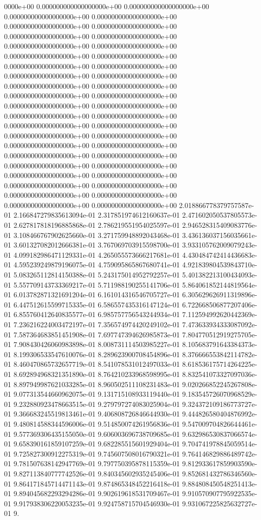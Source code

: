 0000e+00	0.000000000000000000e+00	0.000000000000000000e+00	0.000000000000000000e+00	0.000000000000000000e+00	0.000000000000000000e+00	0.000000000000000000e+00	0.000000000000000000e+00	0.000000000000000000e+00	0.000000000000000000e+00	0.000000000000000000e+00	0.000000000000000000e+00	0.000000000000000000e+00	0.000000000000000000e+00	0.000000000000000000e+00	0.000000000000000000e+00	0.000000000000000000e+00	0.000000000000000000e+00	0.000000000000000000e+00	0.000000000000000000e+00	0.000000000000000000e+00	0.000000000000000000e+00	0.000000000000000000e+00	0.000000000000000000e+00	0.000000000000000000e+00	0.000000000000000000e+00	0.000000000000000000e+00	0.000000000000000000e+00	0.000000000000000000e+00	0.000000000000000000e+00	0.000000000000000000e+00	0.000000000000000000e+00	0.000000000000000000e+00	0.000000000000000000e+00	0.000000000000000000e+00	0.000000000000000000e+00	0.000000000000000000e+00	0.000000000000000000e+00	0.000000000000000000e+00	0.000000000000000000e+00	0.000000000000000000e+00	0.000000000000000000e+00	0.000000000000000000e+00	2.018866778379757587e-01	2.166847279835613094e-01	2.317851974612160637e-01	2.471602050537805573e-01	2.627817818196885868e-01	2.786219551954025597e-01	2.946528315409083776e-01	3.108466767902625660e-01	3.271759948892043468e-01	3.436136037156035661e-01	3.601327082012666381e-01	3.767069703915598700e-01	3.933105762009079243e-01	4.099182986471129331e-01	4.265055573666217681e-01	4.430484742414436683e-01	4.595239249879196075e-01	4.759095865867680741e-01	4.921839804539843710e-01	5.083265112814150388e-01	5.243175014952792257e-01	5.401382213100434093e-01	5.557709143733369217e-01	5.711988190255141706e-01	5.864061852144819564e-01	6.013782871321691204e-01	6.161014316546705727e-01	6.305629626911319896e-01	6.447512615599715335e-01	6.586557435316147124e-01	6.722668506877207406e-01	6.855760412640835577e-01	6.985757756543244934e-01	7.112594992620442369e-01	7.236216224003472197e-01	7.356574974420249102e-01	7.473633934333087092e-01	7.587364683851451908e-01	7.697747394626985873e-01	7.804770512919275705e-01	7.908430426060983898e-01	8.008731114503985227e-01	8.105683791643384373e-01	8.199306533547610076e-01	8.289623900708454896e-01	8.376666553842114782e-01	8.460470865732657719e-01	8.541078531012497033e-01	8.618536175714264225e-01	8.692894968321351890e-01	8.764210233968598995e-01	8.832541073327097036e-01	8.897949987621033285e-01	8.960502511108231483e-01	9.020266852245267808e-01	9.077313544660962075e-01	9.131715108933119440e-01	9.183545726070968529e-01	9.232880923478663515e-01	9.279797274083025904e-01	9.324372109186773727e-01	9.366683245519813461e-01	9.406808726846644930e-01	9.444826580404876992e-01	9.480814588344596006e-01	9.514850074261956836e-01	9.547009704826644461e-01	9.577369306435155050e-01	9.606003696738709685e-01	9.632986530837066574e-01	9.658390161859107259e-01	9.682285515601929404e-01	9.704741978845059514e-01	9.725827300912275319e-01	9.745607508016790321e-01	9.764146829886489742e-01	9.781507638142947769e-01	9.797750395878115359e-01	9.812933617859903590e-01	9.827113840777742526e-01	9.840345602935245406e-01	9.852681432786346560e-01	9.864171845714471143e-01	9.874865348452216418e-01	9.884808450548251413e-01	9.894045682293294286e-01	9.902619618531709467e-01	9.910570907795922535e-01	9.917938306220053235e-01	9.924758715704546930e-01	9.931067225825632727e-01	9.